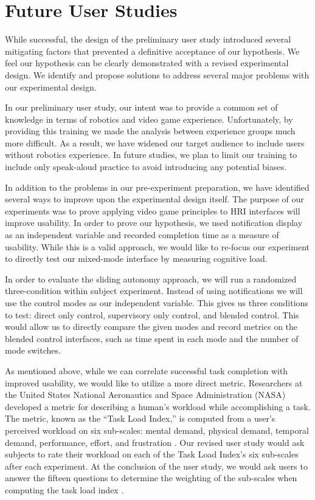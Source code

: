 \section{Future User Studies}
\label{sec:futurestudy}
While successful, the design of the preliminary user study introduced several mitigating factors that prevented a definitive acceptance of our hypothesis. We feel our hypothesis can be clearly demonstrated with a revised experimental design. We identify and propose solutions to address several major problems with our experimental design.

In our preliminary user study, our intent was to provide a common set of knowledge in terms of robotics and video game experience. Unfortunately, by providing this training we made the analysis between experience groups much more difficult. As a result, we have widened our target audience to include users without robotics experience. In future studies, we plan to limit our training to include only speak-aloud practice to avoid introducing any potential biases.

In addition to the problems in our pre-experiment preparation, we have identified several ways to improve upon the experimental design itself. The purpose of our experiments was to prove applying video game principles to HRI interfaces will improve usability. In order to prove our hypothesis, we used notification display as an independent variable and recorded completion time as a measure of usability. While this is a valid approach, we would like to re-focus our experiment to directly test our mixed-mode interface by measuring cognitive load. 

In order to evaluate the sliding autonomy approach, we will run a randomized three-condition within subject experiment. Instead of using notifications we will use the control modes as our independent variable. This gives us three conditions to test: direct only control, supervisory only control, and blended control. This would allow us to directly compare the given modes and record metrics on the blended control interfaces, such as time spent in each mode and the number of mode switches.

As mentioned above, while we can correlate successful task completion with improved usability, we would like to utilize a more direct metric. Researchers at the United States National Aeronautics and Space Administration (NASA) developed a metric for describing a human's workload while accomplishing a task. The metric, known as the ``Task Load Index,'' is computed from a user's perceived workload on six sub-scales: mental demand, physical demand, temporal demand, performance, effort, and frustration \cite{NASA_TLX}. Our revised user study would ask subjects to rate their workload on each of the Task Load Index's six sub-scales after each experiment. At the conclusion of the user study, we would ask users to answer the fifteen questions to determine the weighting of the sub-scales when computing the task load index \cite{NASA_TLX20}.

